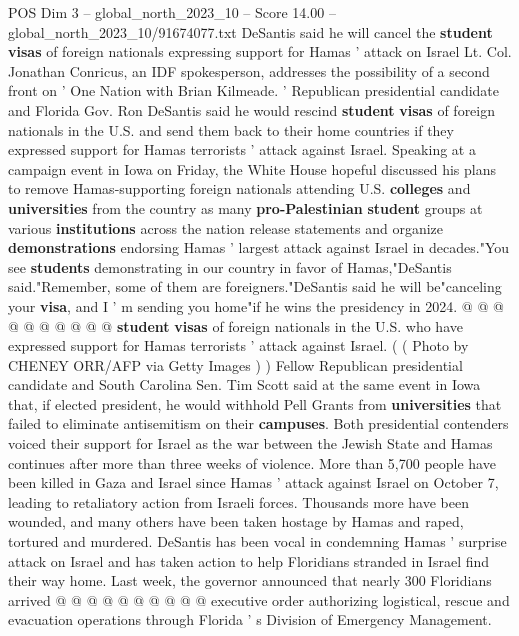 \begin{textsample}{POS Dim 3 – global\_north\_2023\_10 – Score 14.00 – global\_north\_2023\_10/91674077.txt}  \label{ex:f3_pos_203}
DeSantis said he will cancel the \textbf{student} \textbf{visas} of foreign nationals expressing support for Hamas ' attack on Israel Lt.
Col.
Jonathan Conricus, an IDF spokesperson, addresses the possibility of a second front on ' One Nation with Brian Kilmeade. ' Republican presidential candidate and Florida Gov.
Ron DeSantis said he would rescind \textbf{student} \textbf{visas} of foreign nationals in the U.S. and send them back to their home countries if they expressed support for Hamas terrorists ' attack against Israel.
Speaking at a campaign event in Iowa on Friday, the White House hopeful discussed his plans to remove Hamas-supporting foreign nationals attending U.S. \textbf{colleges} and \textbf{universities} from the country as many \textbf{pro-Palestinian} \textbf{student} groups at various \textbf{institutions} across the nation release statements and organize \textbf{demonstrations} endorsing Hamas ' largest attack against Israel in decades."You see \textbf{students} demonstrating in our country in favor of Hamas,"DeSantis said."Remember, some of them are foreigners."DeSantis said he will be"canceling your \textbf{visa}, and I ' m sending you home"if he wins the presidency in 2024. @ @ @ @ @ @ @ @ @ @ \textbf{student} \textbf{visas} of foreign nationals in the U.S. who have expressed support for Hamas terrorists ' attack against Israel. ( ( Photo by CHENEY ORR/AFP via Getty Images ) ) Fellow Republican presidential candidate and South Carolina Sen.
Tim Scott said at the same event in Iowa that, if elected president, he would withhold Pell Grants from \textbf{universities} that failed to eliminate antisemitism on their \textbf{campuses}.
Both presidential contenders voiced their support for Israel as the war between the Jewish State and Hamas continues after more than three weeks of violence.
More than 5,700 people have been killed in Gaza and Israel since Hamas ' attack against Israel on October 7, leading to retaliatory action from Israeli forces.
Thousands more have been wounded, and many others have been taken hostage by Hamas and raped, tortured and murdered.
DeSantis has been vocal in condemning Hamas ' surprise attack on Israel and has taken action to help Floridians stranded in Israel find their way home.
Last week, the governor announced that nearly 300 Floridians arrived @ @ @ @ @ @ @ @ @ @ executive order authorizing logistical, rescue and evacuation operations through Florida ' s Division of Emergency Management.

\end{textsample}
